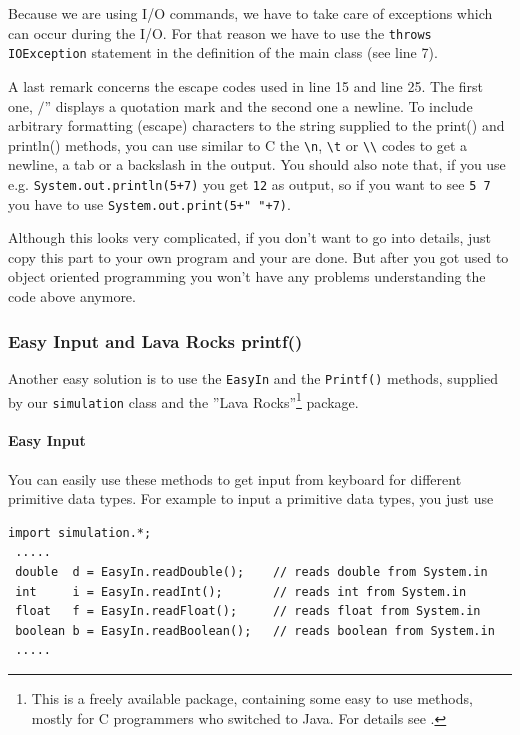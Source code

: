 Because we are using I/O commands, we have to take care of exceptions
which can occur during the I/O. For that reason we have to use the
\verb|throws IOException| statement in the definition of the main
class (see line 7).

A last remark concerns the escape codes used in line 15 and line 25.
The first one, $/$'' displays a quotation mark and the second
one a newline.
To include arbitrary formatting (escape) characters
to the string supplied to the print() and println() methods, you
can use similar to C the \verb|\n|, \verb|\t| or \verb|\\| codes
to get a newline, a tab or a backslash in the output. You should 
also note that, if you use e.g. \verb|System.out.println(5+7)| you
get \verb|12| as output, so if you want to see \verb|5 7| you have
to use \verb|System.out.print(5+" "+7)|.

Although this looks very complicated, if you don't want to go into
details, just copy this part to your own program and your are done.
But after you got used to object oriented programming you won't have
any problems understanding the code above anymore.

\subsubsection{Easy Input and Lava Rocks printf()}
\label{sec:LavaRocks}
Another easy solution is to use the \verb|EasyIn| and the
\verb|Printf()| methods, supplied by our \verb|simulation| class
and the ''Lava Rocks''\footnote{This is a freely available package,
containing some easy to use methods, mostly for C programmers
who switched to Java. For details see \cite{LavaRocks}.} package.

\paragraph{Easy Input}
You can easily use these methods to get input from keyboard
for different primitive data types. For example to input
a primitive data types, you just use
\begin{small}
\begin{verbatim}
import simulation.*;
 .....
 double  d = EasyIn.readDouble();    // reads double from System.in
 int     i = EasyIn.readInt();       // reads int from System.in
 float   f = EasyIn.readFloat();     // reads float from System.in
 boolean b = EasyIn.readBoolean();   // reads boolean from System.in
 .....
\end{verbatim}
\end{small}

